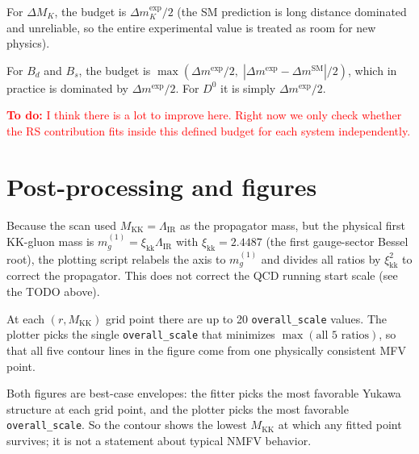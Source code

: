 \documentclass[11pt]{article}
\newcommand{\Mkk}{M_{\mathrm{KK}}}
\newcommand{\LamIR}{\Lambda_{\mathrm{IR}}}
\begin{document}
For $\Delta M_K$, the budget is $\Delta m_K^{\mathrm{exp}} / 2$ (the SM
prediction is long distance dominated and unreliable, so the entire
experimental value is treated as room for new physics).

For $B_d$ and $B_s$, the budget is
$\max(\Delta m^{\mathrm{exp}}/2,\; |\Delta m^{\mathrm{exp}} -
\Delta m^{\mathrm{SM}}|/2)$, which in practice is dominated by
$\Delta m^{\mathrm{exp}}/2$. For $D^0$ it is simply
$\Delta m^{\mathrm{exp}}/2$.


\textcolor{red}{\textbf{To do:} I think there is a lot to improve here. Right now we only check whether the RS
contribution fits inside this defined budget for each system independently.}

\section{Post-processing and figures}


Because the scan used $\Mkk = \LamIR$ as the propagator mass, but the
physical first KK-gluon mass is $m_g^{(1)} = \xi_{\mathrm{kk}} \LamIR$ with
$\xi_{\mathrm{kk}} = 2.4487$ (the first gauge-sector Bessel root), the
plotting script relabels the axis to $m_g^{(1)}$ and divides all ratios by
$\xi_{\mathrm{kk}}^2$ to correct the propagator. This does not correct the
QCD running start scale (see the TODO above).

At each $(r, \Mkk)$ grid point there are up to 20 \texttt{overall\_scale}
values. The plotter picks the single \texttt{overall\_scale} that minimizes
$\max(\text{all 5 ratios})$, so that all five contour lines in the figure come
from one physically consistent MFV point.

Both figures are best-case envelopes: the fitter picks the most favorable
Yukawa structure at each grid point, and the plotter picks the most favorable
\texttt{overall\_scale}. So the contour shows the lowest $\Mkk$ at which
any fitted point survives; it is not a statement about
typical NMFV behavior.
\end{document}
